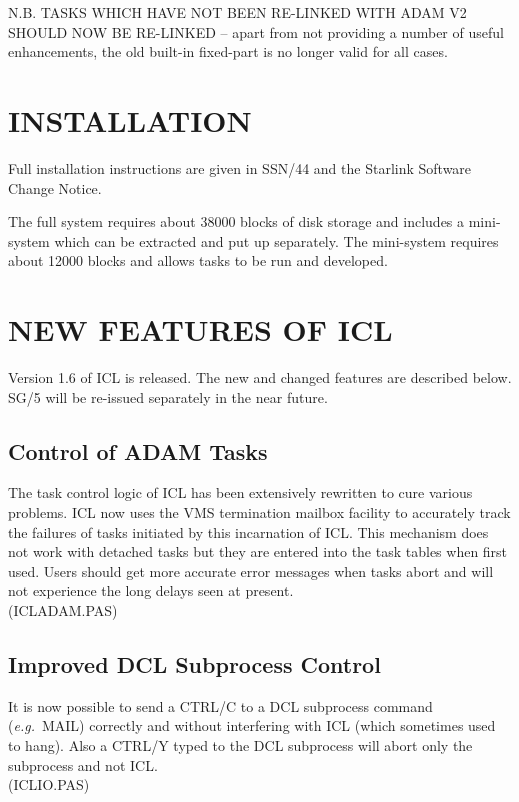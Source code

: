 N.B. TASKS WHICH HAVE NOT BEEN RE-LINKED WITH ADAM V2 SHOULD NOW BE RE-LINKED
-- apart from not providing a number of useful enhancements, the old built-in
fixed-part is no longer valid for all cases.

\newpage
  \setlength{\parskip}{0mm}
  \tableofcontents
  \setlength{\parskip}{\medskipamount}
  \markright{\stardocname}

\section{INSTALLATION}
Full installation instructions are given in SSN/44 and the Starlink Software
Change Notice.

The full system requires about 38000 blocks of disk storage and includes a
mini-system which can be extracted and put up separately. The mini-system
requires about 12000 blocks and allows tasks to be run and  developed.

\section{NEW FEATURES OF ICL}
Version 1.6 of ICL is released. The new and changed features are described
below. SG/5 will be re-issued separately in the near future.

\subsection{Control of ADAM Tasks}
The task control logic of ICL has been extensively rewritten to cure various
problems. ICL now uses the VMS termination mailbox facility to accurately
track the failures of tasks initiated by this incarnation of ICL. This
mechanism does not work with detached tasks but they are entered into the task
tables when first used. Users should get more accurate error messages when
tasks abort and will not experience the long delays seen at present.\\
(ICLADAM.PAS)
\subsection{Improved DCL Subprocess Control}
It is now possible to send a CTRL/C to a DCL subprocess command
({\em e.g.}\ MAIL)
correctly and without interfering with ICL (which sometimes used to hang).
Also a CTRL/Y typed to the DCL subprocess will abort only the subprocess and
not ICL.\\
(ICLIO.PAS)

